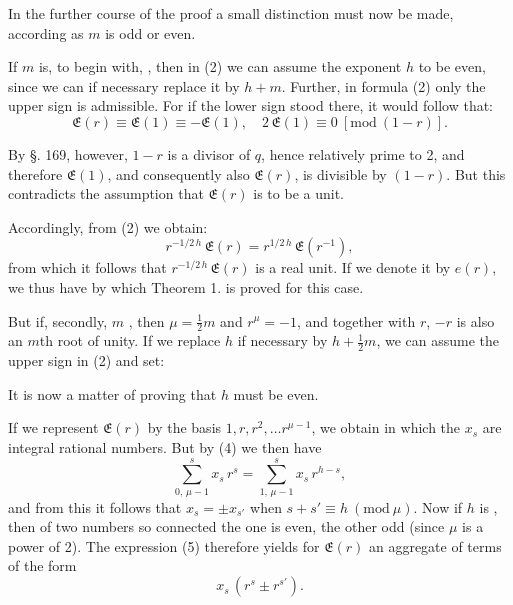 
In the further course of the proof a small distinction must now be made, according as $m$ is odd or even.

If $m$ is, to begin with, , then in (2) we can assume the exponent $h$ to be even, since we can if necessary replace it by $h + m$. Further, in formula (2) only the upper sign is admissible. For if the lower sign stood there, it would follow that:
\[
\mathfrak{E}(r) \equiv \mathfrak{E}(1) \equiv -\mathfrak{E}(1), \quad 2\,\mathfrak{E}(1) \equiv 0\ [\mathrm{mod}\ (1 - r)].
\]

By §. 169, however, $1 - r$ is a divisor of $q$, hence relatively prime to 2, and therefore $\mathfrak{E}(1)$, and consequently also $\mathfrak{E}(r)$, is divisible by $(1 - r)$. But this contradicts the assumption that $\mathfrak{E}(r)$ is to be a unit.

Accordingly, from (2) we obtain:
\[
r^{-1/2\,h}\, \mathfrak{E}(r) = r^{1/2\,h}\, \mathfrak{E}(r^{-1}),
\]
from which it follows that $r^{-1/2\,h}\, \mathfrak{E}(r)$ is a real unit. If we denote it by $e(r)$, we thus have
by which Theorem 1. is proved for this case.

But if, secondly, $m$ , then $\mu = \tfrac{1}{2} m$ and $r^\mu = -1$, and together with $r$, $-r$ is also an $m$th root of unity. If we replace $h$ if necessary by $h + \tfrac{1}{2} m$, we can assume the upper sign in (2) and set:

It is now a matter of proving that $h$ must be even.

If we represent $\mathfrak{E}(r)$ by the basis $1, r, r^2, \ldots r^{\mu-1}$, we obtain
in which the $x_s$ are integral rational numbers. But by (4) we then have
\[
\sum_{0,\,\mu-1}^{s} x_s\, r^s = \sum_{1,\,\mu-1}^{s} x_s\, r^{h-s}, %
\]
and from this it follows that $x_s = \pm x_{s'}$ when $s + s' \equiv h\ (\mathrm{mod}\ \mu)$. Now if $h$ is , then of two numbers so connected the one is even, the other odd (since $\mu$ is a power of 2). The expression (5) therefore yields for $\mathfrak{E}(r)$ an aggregate of terms of the form
\[
x_s\,(r^s \pm r^{s'}).
\]

